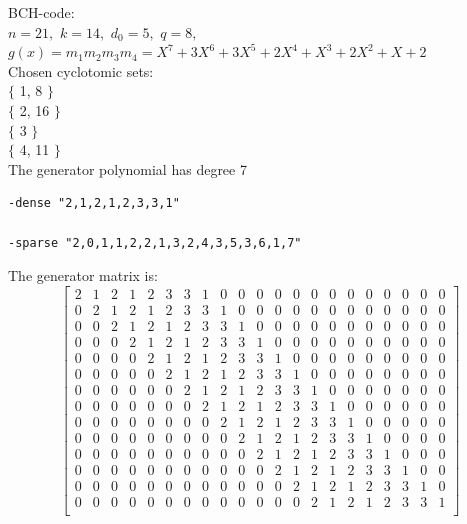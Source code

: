 \noindent
BCH-code:\\
$n=21,$ $k=14,$ $d_0=5,$ $q=8,$ \\
$g(x) = m_{1}m_{2}m_{3}m_{4}=
X^{7} + 3X^{6} + 3X^{5} + 2X^{4} + X^{3} + 2X^{2} + X + 2$
\\
\noindent
Chosen cyclotomic sets:\\
\noindent $\{$ 1, 8 $\}$\\
$\{$ 2, 16 $\}$\\
$\{$ 3 $\}$\\
$\{$ 4, 11 $\}$\\
\bigskip
The generator polynomial has degree 7
\begin{verbatim}
-dense "2,1,2,1,2,3,3,1"

-sparse "2,0,1,1,2,2,1,3,2,4,3,5,3,6,1,7"

\end{verbatim}
The generator matrix is:
$$
\left[
\begin{array}{*{21}{c}}
2 & 1 & 2 & 1 & 2 & 3 & 3 & 1 & 0 & 0 & 0 & 0 & 0 & 0 & 0 & 0 & 0 & 0 & 0 & 0 & 0\\
0 & 2 & 1 & 2 & 1 & 2 & 3 & 3 & 1 & 0 & 0 & 0 & 0 & 0 & 0 & 0 & 0 & 0 & 0 & 0 & 0\\
0 & 0 & 2 & 1 & 2 & 1 & 2 & 3 & 3 & 1 & 0 & 0 & 0 & 0 & 0 & 0 & 0 & 0 & 0 & 0 & 0\\
0 & 0 & 0 & 2 & 1 & 2 & 1 & 2 & 3 & 3 & 1 & 0 & 0 & 0 & 0 & 0 & 0 & 0 & 0 & 0 & 0\\
0 & 0 & 0 & 0 & 2 & 1 & 2 & 1 & 2 & 3 & 3 & 1 & 0 & 0 & 0 & 0 & 0 & 0 & 0 & 0 & 0\\
0 & 0 & 0 & 0 & 0 & 2 & 1 & 2 & 1 & 2 & 3 & 3 & 1 & 0 & 0 & 0 & 0 & 0 & 0 & 0 & 0\\
0 & 0 & 0 & 0 & 0 & 0 & 2 & 1 & 2 & 1 & 2 & 3 & 3 & 1 & 0 & 0 & 0 & 0 & 0 & 0 & 0\\
0 & 0 & 0 & 0 & 0 & 0 & 0 & 2 & 1 & 2 & 1 & 2 & 3 & 3 & 1 & 0 & 0 & 0 & 0 & 0 & 0\\
0 & 0 & 0 & 0 & 0 & 0 & 0 & 0 & 2 & 1 & 2 & 1 & 2 & 3 & 3 & 1 & 0 & 0 & 0 & 0 & 0\\
0 & 0 & 0 & 0 & 0 & 0 & 0 & 0 & 0 & 2 & 1 & 2 & 1 & 2 & 3 & 3 & 1 & 0 & 0 & 0 & 0\\
0 & 0 & 0 & 0 & 0 & 0 & 0 & 0 & 0 & 0 & 2 & 1 & 2 & 1 & 2 & 3 & 3 & 1 & 0 & 0 & 0\\
0 & 0 & 0 & 0 & 0 & 0 & 0 & 0 & 0 & 0 & 0 & 2 & 1 & 2 & 1 & 2 & 3 & 3 & 1 & 0 & 0\\
0 & 0 & 0 & 0 & 0 & 0 & 0 & 0 & 0 & 0 & 0 & 0 & 2 & 1 & 2 & 1 & 2 & 3 & 3 & 1 & 0\\
0 & 0 & 0 & 0 & 0 & 0 & 0 & 0 & 0 & 0 & 0 & 0 & 0 & 2 & 1 & 2 & 1 & 2 & 3 & 3 & 1\\
\end{array}
\right]
$$
